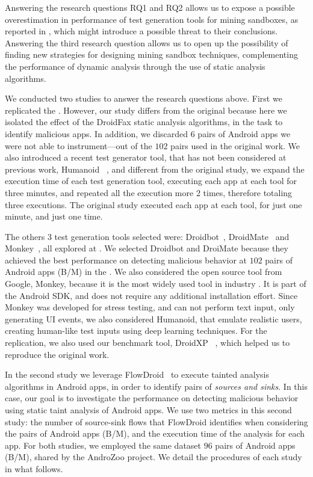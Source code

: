 Answering the research questions RQ1 and RQ2 allows us to expose a possible overestimation in performance of test generation tools for mining sandboxes,
as reported in \blls, which might introduce a possible threat to their conclusions. Answering the third research question
allows us to open up the possibility of finding new strategies for designing mining sandbox techniques, complementing the performance of
dynamic analysis through the use of static analysis algorithms.

We conducted two studies to answer the research questions above. First we replicated the \blls. However, our study differs from the original because here we isolated the effect of the DroidFax static analysis algorithms, in the task to identify malicious apps. In addition, we discarded $6$ pairs of
Android apps we were not able to instrument---out of the $102$ pairs used in the original work. We also introduced a recent test generator tool, that has not been considered at previous work, Humanoid ~\cite{DBLP:conf/kbse/LiY0C19}, and different from the original study, we expand the execution time of each test generation tool, executing each app at each tool for three minutes, and repeated all the execution more 2 times, therefore totaling three executions. The original study executed each app at each tool, for just one minute, and just one time.

The others $3$ test generation tools selected were: Droidbot~\cite{DBLP:conf/icse/LiYGC17},
DroidMate~\cite{DBLP:conf/icse/JamrozikZ16} and Monkey~\cite{Monkey}, all explored at \blls. We selected Droidbot and DroiMate because they achieved
the best performance on detecting malicious behavior at $102$ pairs of Android apps (B/M) in the \blls. We also considered the open source tool from Google, Monkey, because it is the most widely used tool in industry \cite{DBLP:conf/sigsoft/ZengLZXDLYX16}. It is part of the Android SDK, and does not require any additional installation effort. Since Monkey was developed for stress testing, and can not perform text input, only generating
UI events, we also considered Humanoid, that emulate realistic users, creating human-like test inputs using deep learning techniques.
For the replication, we also used our benchmark tool, DroidXP ~\cite{DBLP:conf/scam/CostaMCMVBC20},
which helped us to reproduce the original work.

In the second study we leverage FlowDroid~\cite{DBLP:conf/pldi/ArztRFBBKTOM14} to execute
tainted analysis algorithms in Android apps, in order to identify pairs of \emph{sources and sinks}. In this case,
our goal is to investigate the performance on detecting malicious
behavior using static taint analysis of Android apps. We use two metrics in this second study: the number
of source-sink flows that FlowDroid identifies when considering the pairs of Android apps (B/M), and the
execution time of the analysis for each app.
For both studies, we employed the same dataset $96$ pairs of Android apps (B/M),
shared by the AndroZoo \cite{DBLP:conf/msr/AllixBKT16} project. We detail the procedures of each study in what follows.

